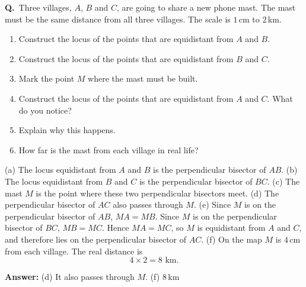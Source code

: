 \documentclass[12pt,a4paper]{article}
\newcounter{sol}
\newcommand{\s}{\refstepcounter{sol}\textbf{Q\thesol.}\ }
\newcommand{\ans}[1]{\par\smallskip\noindent\textbf{Answer:} #1\par}
\newcommand{\pt}[3]{\fill #1 circle (1.5pt); \node[inner sep=2pt,#2] at #1 {$#3$};}
\begin{document}
\s Three villages, \(A\), \(B\) and \(C\), are going to share a new phone mast. The mast must be the same distance from all three villages. The scale is \(1\)\,cm to \(2\)\,km.
\begin{enumerate}
  \item Construct the locus of the points that are equidistant from \(A\) and \(B\).
  \item Construct the locus of the points that are equidistant from \(B\) and \(C\).
  \item Mark the point \(M\) where the mast must be built.
  \item Construct the locus of the points that are equidistant from \(A\) and \(C\). What do you notice?
  \item Explain why this happens.
  \item How far is the mast from each village in real life?
\end{enumerate}

\begin{solbox}
(a) The locus equidistant from \(A\) and \(B\) is the perpendicular bisector of \(AB\). (b) The locus equidistant from \(B\) and \(C\) is the perpendicular bisector of \(BC\). (c) The mast \(M\) is the point where these two perpendicular bisectors meet. (d) The perpendicular bisector of \(AC\) also passes through \(M\). (e) Since \(M\) is on the perpendicular bisector of \(AB\), \(MA=MB\). Since \(M\) is on the perpendicular bisector of \(BC\), \(MB=MC\). Hence \(MA=MC\), so \(M\) is equidistant from \(A\) and \(C\), and therefore lies on the perpendicular bisector of \(AC\). (f) On the map \(M\) is \(4\)\,cm from each village. The real distance is
\[
4\times 2=8\text{ km}.
\]
\end{solbox}
\ans{(d) It also passes through \(M\). \qquad (f) \(8\)\,km}

\begin{center}
\end{center}
\end{document}
